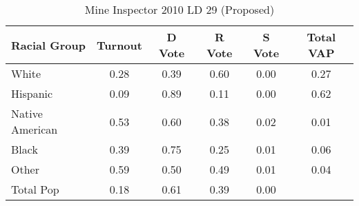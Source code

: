 \begin{table}[htb]
\begin{center}
\caption{Mine Inspector 2010 LD 29 (Proposed)}
\label{smine_vap_ld_29}
\begin{tabular}{lccccc}
  \hline
Racial Group & Turnout & D Vote & R Vote & S Vote & Total VAP \\ 
  \hline
White & 0.28 & 0.39 & 0.60 & 0.00 & 0.27 \\ 
  Hispanic & 0.09 & 0.89 & 0.11 & 0.00 & 0.62 \\ 
  Native American & 0.53 & 0.60 & 0.38 & 0.02 & 0.01 \\ 
  Black & 0.39 & 0.75 & 0.25 & 0.01 & 0.06 \\ 
  Other & 0.59 & 0.50 & 0.49 & 0.01 & 0.04 \\ 
  Total Pop & 0.18 & 0.61 & 0.39 & 0.00 &  \\ 
   \hline
\end{tabular}
\end{center}
\end{table}
